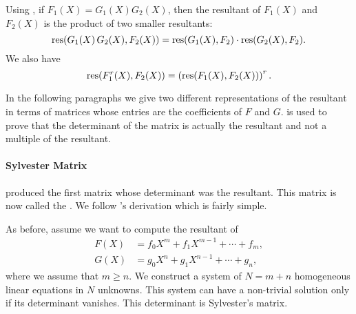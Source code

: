 Using , if $F_1(X) = G_1(X) G_2(X)$, then the
resultant of $F_1(X)$ and $F_2(X)$ 
is the product of two smaller resultants:
\[
\mathop{\rm res}\nolimits(G_1(X) \, G_2(X), F_2(X)) = \mathop{\rm res}\nolimits(G_1(X), F_2) \cdot \mathop{\rm res}\nolimits(G_2(X), F_2).
\]
We also have
\[
\mathop{\rm res}\nolimits(F_1^r(X), F_2(X)) = \left( \mathop{\rm res}\nolimits(F_1(X), F_2(X)) \right)^r.
\]

In the following paragraphs we give two different representations of
the resultant in terms of matrices whose entries are the coefficients
of $F$ and $G$.   is used to prove that
the determinant of the matrix is actually the resultant and not a
multiple of the resultant.

\paragraph{Sylvester Matrix}
{\Euler} produced the first matrix whose determinant was the resultant. 
This matrix is now called the . We follow 
{\Sylvester}'s derivation which is fairly simple. 

As before, assume we want to compute the resultant of 
\[
\begin{aligned}
F(X)&= f_0 X^m + f_1 X^{m-1} + \cdots + f_m,\\
G(X)&= g_0 X^n + g_1 X^{n-1} + \cdots + g_n,
\end{aligned}
\]
where we assume that $m \ge n$.  We construct a system of $N = m+n$
homogeneous linear equations in $N$ unknowns. This system can have a non-trivial solution only if its
determinant vanishes.  This determinant is Sylvester's matrix.

